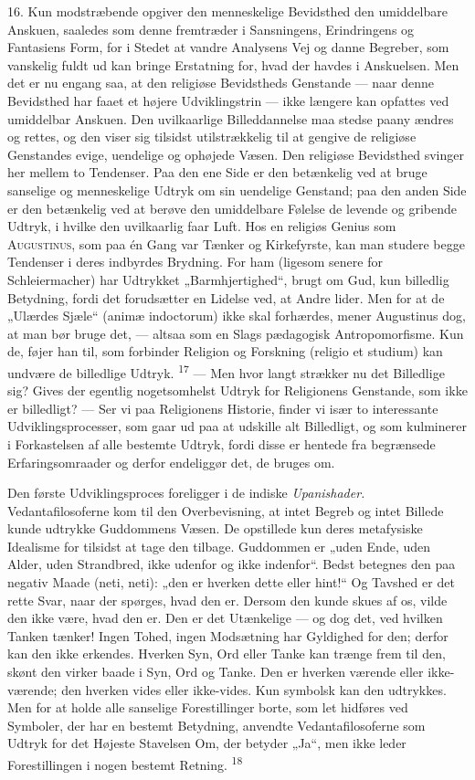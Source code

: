 \documentclass[12pt,a4paper,openany]{book}
\newcommand{\opage}[1]{\marginnote{\footnotesize\textit{[#1]}}}
\begin{document}
16. Kun modstræbende opgiver den menneskelige Bevidsthed den umiddelbare
Anskuen, saaledes som denne fremtræder i Sansningens, Erindringens og
Fantasiens Form, for i Stedet at vandre Analysens Vej og danne Begreber,
som vanskelig fuldt ud kan bringe Erstatning for, hvad der havdes i
Anskuelsen. Men
\opage{41}det er nu engang saa, at den religiøse Bevidstheds Genstande
--- naar denne Bevidsthed har faaet et højere Udviklingstrin --- ikke
længere kan opfattes ved umiddelbar Anskuen. Den uvilkaarlige
Billeddannelse maa stedse paany ændres og rettes, og den viser sig
tilsidst utilstrækkelig til at gengive de religiøse Genstandes evige,
uendelige og ophøjede Væsen. Den religiøse Bevidsthed svinger her mellem
to Tendenser. Paa den ene Side er den betænkelig ved at bruge sanselige
og menneskelige Udtryk om sin uendelige Genstand; paa den anden Side er
den betænkelig ved at berøve den umiddelbare Følelse de levende og
gribende Udtryk, i hvilke den uvilkaarlig faar Luft. Hos en religiøs
Genius som \textsc{Augustinus}, som paa én Gang var Tænker og
Kirkefyrste, kan man studere begge Tendenser i deres indbyrdes Brydning.
For ham (ligesom senere for Schleiermacher) har Udtrykket
„Barmhjertighed“, brugt om Gud, kun billedlig Betydning, fordi det
forudsætter en Lidelse ved, at Andre lider. Men for at de „Ulærdes
Sjæle“ (animæ indoctorum) ikke skal forhærdes, mener Augustinus dog, at
man bør bruge det, --- altsaa som en Slags pædagogisk Antropomorfisme.
Kun de, føjer han til, som forbinder Religion og Forskning (religio et
studium) kan undvære de billedlige Udtryk. \textsuperscript{17} --- Men
hvor langt strækker nu det Billedlige sig? Gives der egentlig
nogetsomhelst Udtryk for Religionens Genstande, som ikke er billedligt?
--- Ser vi paa Religionens Historie, finder vi især to interessante
Udviklingsprocesser, som gaar ud paa at udskille alt Billedligt, og som
kulminerer i Forkastelsen af alle bestemte Udtryk, fordi disse er
hentede fra begrænsede Erfaringsomraader og derfor endeliggør det, de
bruges om.

Den første Udviklingsproces foreligger i de indiske
\textit{Upanishader.} Vedantafilosoferne kom til den Overbevisning, at
intet Begreb og intet Billede kunde udtrykke Guddommens Væsen. De
opstillede kun deres metafysiske Idealisme for tilsidst at tage den
tilbage. Guddommen er „uden Ende, uden Alder, uden Strandbred, ikke
udenfor og ikke indenfor“. Bedst betegnes den paa negativ Maade (neti,
neti): „den er hverken dette eller hint!“ Og Tavshed er det rette Svar,
naar der spørges, hvad den er. Dersom den kunde skues af os, vilde den
ikke være, hvad den er. Den er det Utænkelige --- og dog det, ved
hvilken Tanken tænker! Ingen Tohed, ingen Modsætning har Gyldighed for
den; derfor kan den ikke erkendes. Hverken Syn, Ord eller Tanke kan
trænge frem til den, skønt den virker baade i Syn, Ord og Tanke. Den er
hverken
\opage{42}værende eller ikke-værende; den hverken vides eller
ikke-vides. Kun symbolsk kan den udtrykkes. Men for at holde alle
sanselige Forestillinger borte, som let hidføres ved Symboler, der har
en bestemt Betydning, anvendte Vedantafilosoferne som Udtryk for det
Højeste Stavelsen Om, der betyder „Ja“, men ikke leder Forestillingen i
nogen bestemt Retning. \textsuperscript{18}
\end{document}
